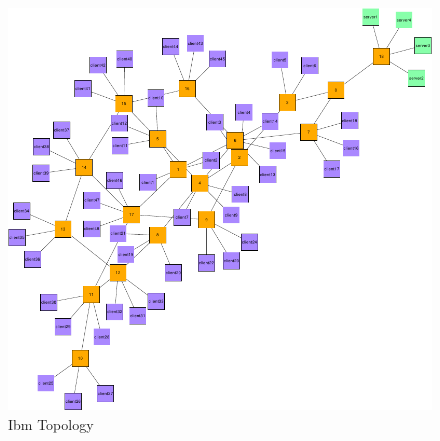 \begin{figure}[htbp]
    \centering
    \includegraphics[width=\linewidth]{Networks/Ibm_final.pdf}
    \caption{Ibm Topology}
    \label{fig:Ibm}
\end{figure}

